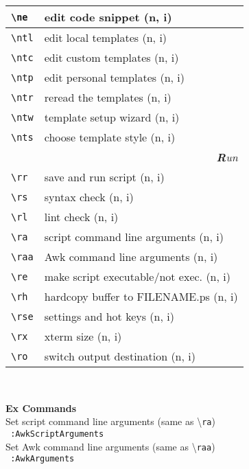\documentclass[oneside,10pt,landscape,DIV16]{scrartcl}
\begin{document}
\begin{multicols}{3}
\begin{center}
\begin{tabular}[]{|p{11mm}|p{62mm}|}
\hline \verb'\ne'  & edit code snippet         \hfill (n, i)   \\
%
\hline     \verb'\ntl' & edit local templates      \hfill (n, i)\\
\hline     \verb'\ntc' & edit custom templates     \hfill (n, i)\\
\hline     \verb'\ntp' & edit personal templates   \hfill (n, i)\\
\hline     \verb'\ntr' & reread the templates      \hfill (n, i)\\
\hline     \verb'\ntw' & template setup wizard     \hfill (n, i)\\
\hline     \verb'\nts' & choose template style     \hfill (n, i)\\
\hline
\hline
\multicolumn{2}{|r|}{\textsl{\textbf{R}un}} \\[1.0ex]
\hline \verb'\rr '  & save and run script                 \hfill (n, i)   \\
\hline \verb'\rs '  & syntax check                        \hfill (n, i)   \\
\hline \verb'\rl '  & lint check                          \hfill (n, i)   \\
\hline \verb'\ra '  & script command line arguments       \hfill (n, i)   \\
\hline \verb'\raa'  & Awk command line arguments          \hfill (n, i)   \\
\hline \verb'\re'   & make script executable/not exec.    \hfill (n, i)   \\
\hline \verb'\rh '  & hardcopy buffer to FILENAME.ps      \hfill (n, i)   \\
\hline \verb'\rse'  & settings and hot keys               \hfill (n, i)   \\
\hline \verb'\rx '  & xterm size                          \hfill (n, i)   \\
\hline \verb'\ro '  & switch output destination           \hfill (n, i)   \\
\hline
\end{tabular}\\
%
\begin{flushleft}
\large{\textbf{Ex Commands}}\\[1.0ex]
%
Set script command line arguments (same as \textbackslash\texttt{ra})\\[1.0ex]
\texttt{ :AwkScriptArguments}\\[1.0ex]
%
Set Awk command line arguments (same as \textbackslash\texttt{raa})\\[1.0ex]
\texttt{ :AwkArguments}\\[1.0ex]
\end{flushleft}
%
\end{center}%
\end{multicols}%
%
\end{document}

